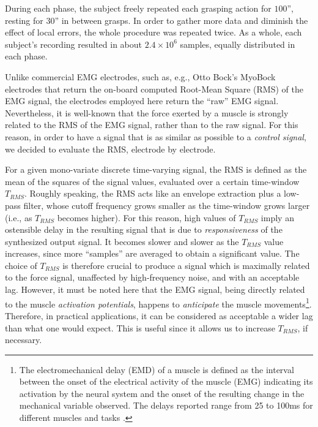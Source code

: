 During each phase, the subject freely repeated each grasping action
for $100$'', resting for $30$'' in between grasps. In order to gather
more data and diminish the effect of local errors, the whole procedure
was repeated twice. As a whole, each subject's recording resulted in
about $2.4\times 10^6$ samples, equally distributed in each phase.

Unlike commercial EMG electrodes, such as, e.g., Otto Bock's MyoBock
electrodes \cite{ottobock} that return the on-board computed Root-Mean
Square (RMS) of the EMG signal, the electrodes employed here return
the ``raw'' EMG signal.%
Nevertheless, it is well-known \cite{deluca,zecca} that the force
exerted by a muscle is strongly related to the RMS of the EMG signal,
rather than to the raw signal. For this reason, in order to have a
signal that is as similar as possible to a \emph{control signal}, we
decided to evaluate the RMS, electrode by electrode.

For a given mono-variate discrete time-varying signal, the RMS is
defined as the mean of the squares of the signal values, evaluated
over a certain time-window $T_{RMS}$. Roughly speaking, the RMS acts
like an envelope extraction plus a low-pass filter, whose cutoff
frequency grows smaller as the time-window grows larger (i.e., as
$T_{RMS}$ becomes higher). For this reason, high values of $T_{RMS}$
imply an ostensible delay in the resulting signal that is due to
\emph{responsiveness} of the synthesized output signal.  It becomes
slower and slower as the $T_{RMS}$ value increases, since more
``samples'' are averaged to obtain a significant value. The choice of
$T_{RMS}$ is therefore crucial to produce a signal which is maximally
related to the force signal, unaffected by high-frequency noise, and
with an acceptable lag. However, it must be noted here that the EMG
signal, being directly related to the muscle \emph{activation
potentials}, happens to \emph{anticipate} the muscle
movements\footnote{The electromechanical delay (EMD) of a muscle is
defined as the interval between the onset of the electrical activity
of the muscle (EMG) indicating its activation by the neural system and
the onset of the resulting change in the mechanical variable
observed. The delays reported range from 25 to 100ms for different
muscles and tasks \cite{Wolf1994}.}. Therefore, in practical
applications, it can be considered as acceptable a wider lag than what
one would expect.
This is useful since it allows us to increase $T_{RMS}$, if necessary.

